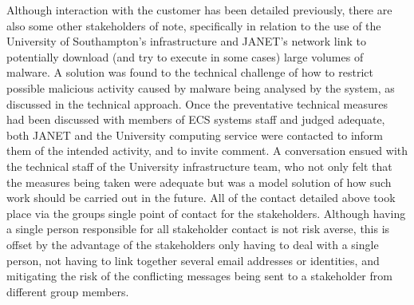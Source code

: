 Although interaction with the customer has been detailed previously, there are
also some other stakeholders of note, specifically in relation to the use of the
University of Southampton's infrastructure and JANET's network link to
potentially download (and try to execute in some cases) large volumes of
malware. A solution was found to the technical challenge of how to restrict
possible malicious activity caused by malware being analysed by the system, as
discussed in the technical approach. Once the preventative technical measures
had been discussed with members of ECS systems staff and judged adequate, both
JANET and the University computing service were contacted to inform them of the
intended activity, and to invite comment. A conversation ensued with the
technical staff of the University infrastructure team, who not only felt that
the measures being taken were adequate but was a model solution of how such work
should be carried out in the future. All of the contact detailed above took
place via the groups single point of contact for the stakeholders. Although
having a single person responsible for all stakeholder contact is not risk
averse, this is offset by the advantage of the stakeholders only having to deal
with a single person, not having to link together several email addresses or
identities, and mitigating the risk of the conflicting messages being sent to a
stakeholder from different group members.

